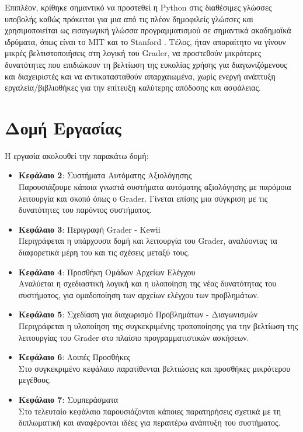 \documentclass[diploma]{softlab-thesis}
\begin{document}
\bigskip

Επιπλέον, κρίθηκε σημαντικό να προστεθεί η Python στις διαθέσιμες γλώσσες
υποβολής καθώς πρόκειται για μια από τις πλέον δημοφιλείς γλώσσες και
χρησιμοποιείται ως εισαγωγική γλώσσα προγραμματισμού σε σημαντικά ακαδημαϊκά
ιδρύματα, όπως είναι το MIT και το Stanford \cite{website:popularpython}.
Τέλος, ήταν απαραίτητο να γίνουν μικρές βελτιστοποιήσεις στη λογική του Grader,
να προστεθούν μικρότερες δυνατότητες που επιδιώκουν τη βελτίωση της ευκολίας
χρήσης για διαγωνιζόμενους και διαχειριστές και να αντικατασταθούν
απαρχαιωμένα, χωρίς ενεργή ανάπτυξη εργαλεία/βιβλιοθήκες για την επίτευξη
καλύτερης απόδοσης και ασφάλειας.

\newpage

\section{Δομή Εργασίας}

Η εργασία ακολουθεί την παρακάτω δομή:

\begin{itemize}
  \item \textbf{Κεφάλαιο 2}: Συστήματα Αυτόματης Αξιολόγησης \\
    Παρουσιάζουμε κάποια γνωστά συστήματα αυτόματης αξιολόγησης με παρόμοια
    λειτουργία και σκοπό όπως ο Grader. Γίνεται επίσης μια σύγκριση με τις
    δυνατότητες του παρόντος συστήματος.
  \item \textbf{Κεφάλαιο 3}: Περιγραφή Grader - Kewii \\
    Περιγράφεται η υπάρχουσα δομή και λειτουργία του Grader, αναλύοντας τα
    διαφορετικά μέρη του και τις σχέσεις μεταξύ τους.
  \item \textbf{Κεφάλαιο 4}: Προσθήκη Ομάδων Αρχείων Ελέγχου \\
    Αναλύεται η σχεδιαστική λογική και η υλοποίηση της νέας δυνατότητας του
    συστήματος, για ομαδοποίηση των αρχείων ελέγχου των προβλημάτων.
  \item \textbf{Κεφάλαιο 5}: Σχεδίαση για διαχωρισμό Προβλημάτων - Διαγωνισμών \\
    Περιγράφεται η υλοποίηση της συγκεκριμένης τροποποίησης για την βελτίωση της
    λειτουργίας του Grader στο πλαίσιο προγραμματιστικών ασκήσεων.
  \item \textbf{Κεφάλαιο 6}: Λοιπές Προσθήκες \\
    Στο συγκεκριμένο κεφάλαιο παρατίθενται βελτιώσεις και προσθήκες μικρότερου
    μεγέθους.
  \item \textbf{Κεφάλαιο 7}: Συμπεράσματα \\
    Στο τελευταίο κεφάλαιο παρουσιάζονται κάποιες παρατηρήσεις σχετικά με τη
    διπλωματική και αναφέρονται ιδέες για περαιτέρω ανάπτυξη του συστήματος.
\end{itemize}
\end{document}
